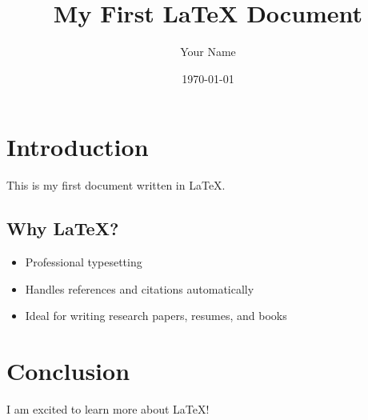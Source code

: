 \documentclass{article} %
\title{My First LaTeX Document}
\author{Your Name}
\date{\today}
\begin{document}
\maketitle

\section{Introduction}
This is my first document written in \LaTeX.

\subsection{Why LaTeX?}
\begin{itemize}
    \item Professional typesetting
    \item Handles references and citations automatically
    \item Ideal for writing research papers, resumes, and books
\end{itemize}

\section{Conclusion}
I am excited to learn more about \LaTeX!
\end{document}
